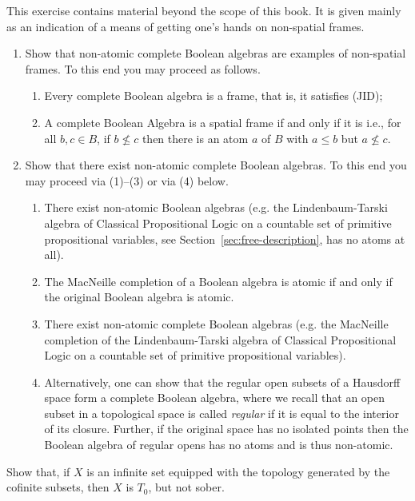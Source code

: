 \begin{exercise}\label{exer:non-spatial}
This exercise contains material beyond the scope of this book. It is given mainly as an indication of a means of getting one's hands on non-spatial frames.
\begin{enumerate}
\item Show that non-atomic complete Boolean algebras are examples of non-spatial frames. To this end you may proceed as follows.
\begin{enumerate}[label=(\arabic*)]
\item Every complete Boolean algebra is a frame, that is, it satisfies (JID);
\item A complete Boolean Algebra is a spatial frame if and only if  it is  i.e., for all $b,c\in B$, if $b\nleq c$ then there is an atom $a$ of $B$ with $a\leq b$ but $a\nleq c$.
\end{enumerate}
\item Show that there exist non-atomic complete Boolean algebras. To this end you may proceed via (1)--(3) or via (4) below.
\begin{enumerate}[label=(\arabic*)]
\item There exist non-atomic Boolean algebras (e.g. the Lindenbaum-Tarski algebra of Classical Propositional Logic on a countable set of primitive propositional variables, see Section~\ref{sec:free-description}, has no atoms at all).
\item The MacNeille completion \cite{Mac37} of a Boolean algebra is atomic if and only if the original Boolean algebra is atomic.
\item There exist non-atomic complete Boolean algebras (e.g. the MacNeille completion of the Lindenbaum-Tarski algebra of Classical Propositional Logic on a countable set of primitive propositional variables).
\item Alternatively, one can show that the regular open subsets of a Hausdorff space form a complete Boolean algebra, where we recall that an open subset in a topological space is called \emph{regular} if it is equal to the interior of its closure. Further, if the original space has no isolated points then the Boolean algebra of regular opens has no atoms and is thus non-atomic.
\end{enumerate}
\end{enumerate}
\end{exercise}

\begin{exercise}\label{exer:non-sober}
  Show that, if $X$ is an infinite set equipped with the topology generated by the cofinite subsets, then $X$ is $T_0$, but not sober.
\end{exercise}

